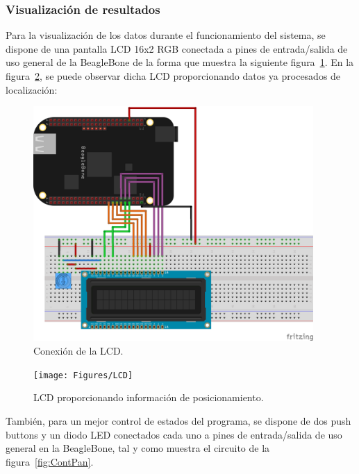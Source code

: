 \subsubsection{Visualización de resultados}

Para la visualización de los datos durante el funcionamiento del sistema, se dispone de una pantalla LCD 16x2 RGB conectada a pines de entrada/salida de uso general de la BeagleBone de la forma que muestra la siguiente figura~\ref{fig:LCDCon}. En la figura~\ref{fig:LCDFunc}, se puede observar dicha LCD proporcionando datos ya procesados de localización:

\begin{figure}[H]
\centering
\includegraphics[width=0.95\textwidth]{Figures/LCD_Con}
\caption[Conexión de la LCD.]{Conexión de la LCD.}
\label{fig:LCDCon}
\end{figure} 

\begin{figure}[H]
\centering
\texttt{[image: Figures/LCD]}
\caption[LCD proporcionando información de posicionamiento.]{LCD proporcionando información de posicionamiento.}
\label{fig:LCDFunc}
\end{figure}

También, para un mejor control de estados del programa, se dispone de dos push buttons y un diodo LED conectados cada uno a pines de entrada/salida de uso general en la BeagleBone, tal y como muestra el circuito de la figura~\ref{fig:ContPan}.

